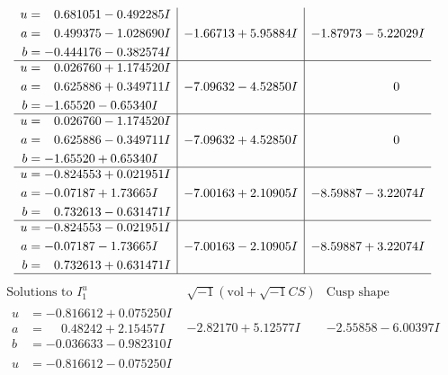 \documentclass[1p]{elsarticle_modified}
\theoremstyle{definition}
\newcommand{\I}{\sqrt{-1}}
\begin{document}
$$\begin{array}{c|c|c}
\begin{aligned}
u &= \phantom{-}0.681051 - 0.492285 I \\
a &= \phantom{-}0.499375 - 1.028690 I \\
b &= -0.444176 - 0.382574 I\end{aligned}
 & -1.66713 + 5.95884 I & -1.87973 - 5.22029 I \\ \hline\begin{aligned}
u &= \phantom{-}0.026760 + 1.174520 I \\
a &= \phantom{-}0.625886 + 0.349711 I \\
b &= -1.65520 - 0.65340 I\end{aligned}
 & -7.09632 - 4.52850 I & \phantom{-0.000000 } 0 \\ \hline\begin{aligned}
u &= \phantom{-}0.026760 - 1.174520 I \\
a &= \phantom{-}0.625886 - 0.349711 I \\
b &= -1.65520 + 0.65340 I\end{aligned}
 & -7.09632 + 4.52850 I & \phantom{-0.000000 } 0 \\ \hline\begin{aligned}
u &= -0.824553 + 0.021951 I \\
a &= -0.07187 + 1.73665 I \\
b &= \phantom{-}0.732613 - 0.631471 I\end{aligned}
 & -7.00163 + 2.10905 I & -8.59887 - 3.22074 I \\ \hline\begin{aligned}
u &= -0.824553 - 0.021951 I \\
a &= -0.07187 - 1.73665 I \\
b &= \phantom{-}0.732613 + 0.631471 I\end{aligned}
 & -7.00163 - 2.10905 I & -8.59887 + 3.22074 I\\
 \hline 
 \end{array}$$\newpage$$\begin{array}{c|c|c}  
\text{Solutions to }I^u_{1}& \I (\text{vol} + \sqrt{-1}CS) & \text{Cusp shape}\\
 \hline 
\begin{aligned}
u &= -0.816612 + 0.075250 I \\
a &= \phantom{-}0.48242 + 2.15457 I \\
b &= -0.036633 - 0.982310 I\end{aligned}
 & -2.82170 + 5.12577 I & -2.55858 - 6.00397 I \\ \hline\begin{aligned}
u &= -0.816612 - 0.075250 I \\

\end{aligned}
\end{array}$$
\end{document}

